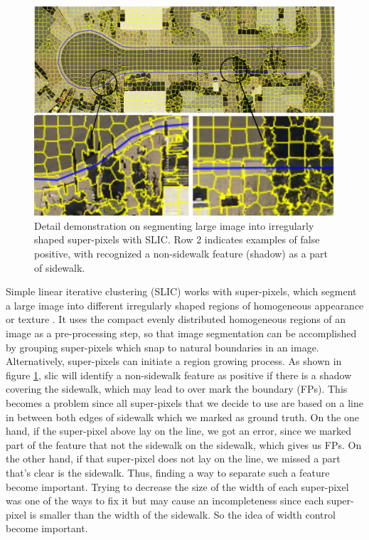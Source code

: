 \begin{figure}[H]
    \centering
    \includegraphics[width=\textwidth]{Figures/slic_sample1.pdf}
    \caption[Example of Simple Linear Iterative Clustering]{Detail demonstration on segmenting large image into irregularly shaped super-pixels with \ac{SLIC}. Row 2 indicates examples of false positive, with recognized a non-sidewalk feature (shadow) as a part of sidewalk.}
    \label{fig:slic}
\end{figure}

Simple linear iterative clustering (SLIC) works with super-pixels, which segment a large image into different irregularly shaped regions of homogeneous appearance or texture \cite{Achanta:149300}. It uses the compact evenly distributed homogeneous regions of an image as a pre-processing step, so that image segmentation can be accomplished by grouping super-pixels which snap to natural boundaries in an image. Alternatively, super-pixels can initiate a region growing process\cite{Borovec2017-fz}. As shown in figure \ref{fig:slic}, slic will identify a non-sidewalk feature as positive if there is a shadow covering the sidewalk, which may lead to over mark the boundary (\aclp{FP}). This becomes a problem since all super-pixels that we decide to use are based on a line in between both edges of sidewalk which we marked as ground truth. On the one hand, if the super-pixel above lay on the line, we got an error, since we marked part of the feature that not the sidewalk on the sidewalk, which gives us \aclp{FP}. On the other hand, if that super-pixel does not lay on the line, we missed a part that's clear is the sidewalk. Thus, finding a way to separate such a feature become important. Trying to decrease the size of the width of each super-pixel was one of the ways to fix it but may cause an incompleteness since each super-pixel is smaller than the width of the sidewalk. So the idea of width control become important.

